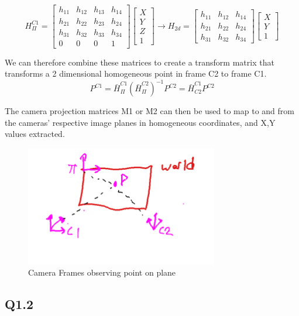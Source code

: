 \documentclass[12pt]{article}
\begin{document}
$$
H_{\Pi}^{C1}=
\begin{bmatrix}
h_{11} & h_{12} & h_{13} & h_{14} \\
h_{21} & h_{22} & h_{23} & h_{24} \\
h_{31} & h_{32} & h_{33} & h_{34} \\
0 & 0 & 0 & 1
\end{bmatrix}
\begin{bmatrix}
X \\ Y \\ Z \\ 1
\end{bmatrix}
\rightarrow
H_{2d}=
\begin{bmatrix}
h_{11} & h_{12} & h_{14} \\
h_{21} & h_{22} & h_{24} \\
h_{31} & h_{32} & h_{34} 
\end{bmatrix}
\begin{bmatrix}
X \\ Y  \\ 1
\end{bmatrix}
$$

We can therefore combine these matrices to create a transform matrix that transforms a 2 dimensional homogeneous point in frame C2 to frame C1.
$$
P^{C1} = 
\bar{H}_{\Pi}^{C1}
(\bar{H}_{\Pi}^{C2})^{-1}
P^{C2}
=
\bar{H}_{C2}^{C1}
P^{C2}
$$

The camera projection matrices M1 or M2 can then be used to map to and from the cameras' respective image planes in homogeneous coordinates, and X,Y values extracted.

\begin{figure}[H]
\centering
\includegraphics[page=1,width=0.75\textwidth]{q1_1a}
\caption{ Camera Frames observing point on plane } 
\label{fig:autoencout}
\end{figure}   

\newpage
\subsection{Q1.2}
\end{document}
